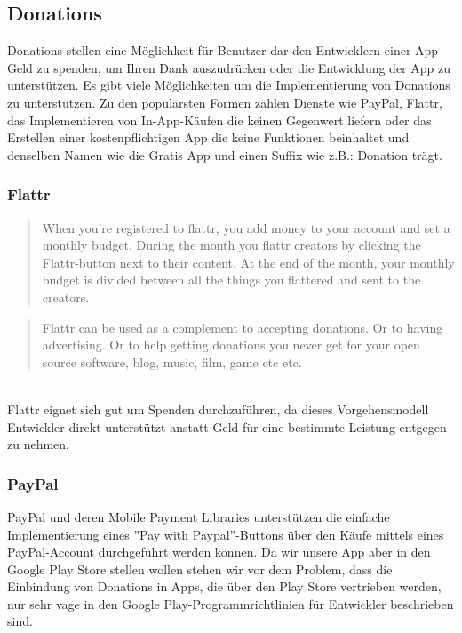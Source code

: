 \documentclass[FIPLY_base.tex]{subfiles}
\author{Andreas Denkmayr}
\date{25. Februar 2016}
\begin{document}
\subsection{Donations}
Donations stellen eine Möglichkeit für Benutzer dar den Entwicklern einer App Geld zu spenden, um Ihren Dank auszudrücken oder die Entwicklung der App zu unterstützen.
Es gibt viele Möglichkeiten um die Implementierung von Donations zu unterstützen.\newline
Zu den populärsten Formen zählen Dienste wie PayPal, Flattr, das Implementieren von In-App-Käufen die keinen Gegenwert liefern oder das Erstellen einer kostenpflichtigen App die keine Funktionen beinhaltet und denselben Namen wie die Gratis App und einen Suffix wie z.B.: Donation trägt.


\subsubsection{Flattr}
\begin{quote}
When you're registered to flattr, you add money to your account and set a monthly budget. During the month you flattr creators by clicking the Flattr-button next to their content. At the end of the month, your monthly budget is divided between all the things you flattered and sent to the creators.
\end{quote}\cite{flattr} 

\begin{quote}
Flattr can be used as a complement to accepting donations. Or to having advertising. Or to help getting donations you never get for your open source software, blog, music, film, game etc etc.
\end{quote}\cite{flattr} 

\ \\
Flattr eignet sich gut um Spenden durchzuführen, da dieses Vorgehensmodell Entwickler direkt unterstützt anstatt Geld für eine bestimmte Leistung entgegen zu nehmen. 

\newpage
\subsubsection{PayPal}
PayPal und deren Mobile Payment Libraries unterstützen die einfache Implementierung eines ''Pay with Paypal''-Buttons über den Käufe mittels eines PayPal-Account durchgeführt werden können.
Da wir unsere App aber in den Google Play Store stellen wollen stehen wir vor dem Problem, dass die Einbindung von Donations in Apps, die über den Play Store vertrieben werden, nur sehr vage in den Google Play-Programmrichtlinien für Entwickler beschrieben sind.
\end{document}
